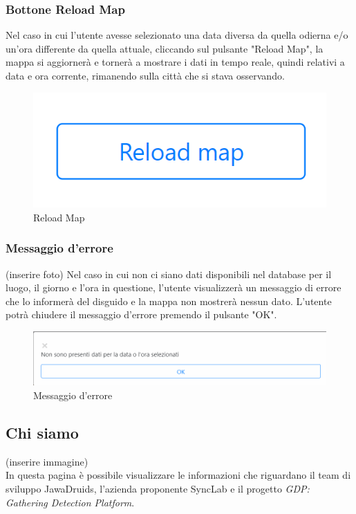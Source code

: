 \subsubsection{Bottone Reload Map} \label{UtilizzoDiGDPGatheringDetecionPlatformContenutoCentralePaginaInizialeHomeBottoneReloadMap}
Nel caso in cui l'utente avesse selezionato una data diversa da quella odierna e/o un'ora differente da quella attuale, cliccando sul pulsante "Reload Map", la mappa si aggiornerà e tornerà a mostrare i dati in tempo reale, quindi relativi a data e ora corrente, rimanendo sulla città che si stava osservando. 
\begin{center}
	\begin{figure}
		\includegraphics[width=0.3\linewidth]{../immagini/manualeUtente/ReloadMap.png}
		\caption{Reload Map}
	\end{figure}
\end{center}
\subsubsection{Messaggio d'errore} \label{UtilizzoDiGDPGatheringDetecionPlatformContenutoCentralePaginaInizialeHomeMessaggioDiErrore}
(inserire foto)
Nel caso in cui non ci siano dati disponibili nel database per il luogo, il giorno e l'ora in questione, l'utente visualizzerà un messaggio di errore che lo informerà del disguido e la mappa non mostrerà nessun dato. L'utente potrà chiudere il messaggio d'errore premendo il pulsante "OK". 
\begin{center}
	\begin{figure}
		\includegraphics[width=0.5\linewidth]{../immagini/manualeUtente/MessaggioErrore.png}
		\caption{Messaggio d'errore}
	\end{figure}
\end{center}
\subsection{Chi siamo} \label{UtilizzoDiGDPGatheringDetecionPlatformContenutoCentraleChiSiamo}
(inserire immagine)\\
In questa pagina è possibile visualizzare le informazioni che riguardano il team di sviluppo JawaDruids, l'azienda proponente SyncLab e il progetto \textit{GDP: Gathering Detection Platform}. 


